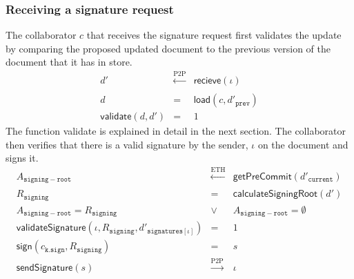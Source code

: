 \subsubsection{Receiving a signature request}
The collaborator $c$ that receives the signature request first validates the update by comparing the proposed updated document to the previous version of the document that it has in store. 
\begin{eqnarray}
   d' & \xleftarrow[]{\text{P2P}} & \mathsf{recieve}(\iota) \\
    d & = &\mathsf{load}(c, {d'}_{\mathtt{prev}}) \\
    \mathsf{validate}(d, d') & = & 1 
\end{eqnarray}
The function \textsf{validate} is explained in detail in the next section.
The collaborator then verifies that there is a valid signature by the sender, $\iota$ on the document and signs it.\\
\begin{eqnarray}
    A_{\mathtt{signing-root}} & \xleftarrow[]{\text{ETH}} & \mathsf{getPreCommit}(d'_{\mathtt{current}}) \\
    R_{\mathtt{signing}} & = & \mathsf{calculateSigningRoot}(d')\\
    A_{\mathtt{signing-root}} = R_{\mathtt{signing}} &\lor & A_{\mathtt{signing-root}} = \emptyset \\
    \mathsf{validateSignature}(\iota, R_{\mathtt{signing}}, {d'}_{\mathtt{signatures}[\iota]}) & = & 1\\
    \mathsf{sign}(c_{\mathtt{k.sign}}, R_{\mathtt{signing}}) & = & s \\
    \mathsf{sendSignature}(s) &\xrightarrow[]{\text{P2P}}& \iota
\end{eqnarray}

